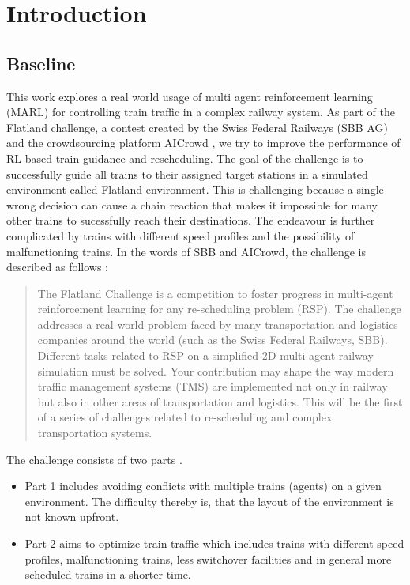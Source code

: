 \chapter{Introduction}\label{chap.einleitung}
\section{Baseline}\label{baseline}
This work explores a real world usage of multi agent reinforcement learning (MARL) for controlling train traffic in a complex railway system.
As part of the Flatland challenge, a contest created by the Swiss Federal Railways (SBB AG) and the crowdsourcing platform AICrowd \cite{aicrowd}, we try to improve the performance of RL based train guidance and rescheduling. The goal of the challenge is to successfully guide all trains to their assigned target stations in a simulated environment called Flatland environment.
This is challenging because a single wrong decision can cause a chain reaction that makes it impossible for many other trains to sucessfully reach their destinations. The endeavour is further complicated by trains with different speed profiles and the possibility of malfunctioning trains. In the words of SBB and AICrowd, the challenge is described as follows \cite{aicrowd}:
\begin{quote}
	The Flatland Challenge is a competition to foster progress in multi-agent reinforcement learning for any re-scheduling problem (RSP). The challenge addresses a real-world problem faced by many transportation and logistics companies around the world (such as the Swiss Federal Railways, SBB). Different tasks related to RSP on a simplified 2D multi-agent railway simulation must be solved. Your contribution may shape the way modern traffic management systems (TMS) are implemented not only in railway but also in other areas of transportation and logistics. This will be the first of a series of challenges related to re-scheduling and complex transportation systems.
\end{quote}
The challenge consists of two parts \cite{aicrowd}.  
\begin{itemize}
	\item Part 1 includes avoiding conflicts with multiple trains (agents) on a given environment. The difficulty thereby is, that the layout of the environment is not known upfront.
	\item Part 2 aims to optimize train traffic which includes trains with different speed profiles, malfunctioning trains, less switchover facilities and in general more scheduled trains in a shorter time.
\end{itemize}

